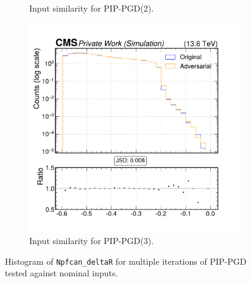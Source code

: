 \begin{figure}[h]
\begin{subfigure}[t]{0.32\textwidth}
    \caption*{Input similarity for PIP-PGD(2).}
  \end{subfigure}\hfill
  \begin{subfigure}[t]{0.32\textwidth}
    \includegraphics[width=\linewidth]{media/output/features/compare/combined_it_3/cmp_npf_arr_Npfcan_deltaR.pdf}
    \caption*{Input similarity for PIP-PGD(3).}
  \end{subfigure}

  \caption*{Histogram of \texttt{Npfcan\_deltaR} for multiple iterations of PIP-PGD tested against nominal inputs.}
  \label{fig:combined_input_Npfcan_deltaR}
\end{figure}

